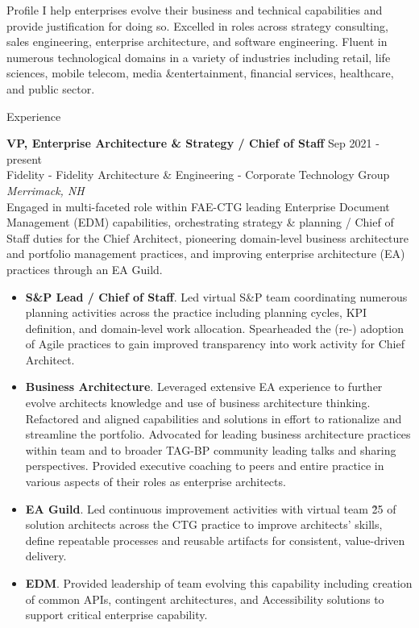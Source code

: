 \documentclass{resume} %
\begin{document}
\begin{rSection}{Profile}
I help enterprises evolve their business and technical capabilities and provide justification for doing so. Excelled in roles across strategy consulting, sales engineering, enterprise architecture, and software engineering. Fluent in numerous technological domains in a variety of industries including retail, life sciences, mobile telecom, media \&entertainment, financial services, healthcare, and public sector.

\end{rSection}

\begin{rSection}{Experience}

\textbf{VP, Enterprise Architecture \& Strategy / Chief of Staff} \hfill Sep 2021 - present\\
Fidelity - Fidelity Architecture \& Engineering - Corporate Technology Group \hfill \textit{Merrimack, NH}\\
Engaged in multi-faceted role within FAE-CTG leading Enterprise Document Management (EDM) capabilities, orchestrating strategy \& planning / Chief of Staff duties for the Chief Architect, pioneering domain-level business architecture and portfolio management practices, and improving enterprise architecture (EA) practices through an EA Guild.

\begin{itemize}
   \itemsep -3pt {} 
   \item \textbf{S\&P Lead / Chief of Staff}. Led virtual S\&P team coordinating numerous planning activities across the practice including planning cycles, KPI definition, and domain-level work allocation. Spearheaded the (re-) adoption of Agile practices to gain improved transparency into work activity for Chief Architect.
   \item \textbf{Business Architecture}. Leveraged extensive EA experience to further evolve architects knowledge and use of business architecture thinking. Refactored and aligned capabilities and solutions in effort to rationalize and streamline the portfolio. Advocated for leading business architecture practices within team and to broader TAG-BP community leading talks and sharing perspectives. Provided executive coaching to peers and entire practice in various aspects of their roles as enterprise architects.
   \item \textbf{EA Guild}. Led continuous improvement activities with virtual team \~25 of solution architects across the CTG practice to improve architects' skills, define repeatable processes and reusable artifacts for consistent, value-driven delivery.
   \item \textbf{EDM}. Provided leadership of team evolving this capability including creation of common APIs, contingent architectures, and Accessibility solutions to support critical enterprise capability. 
 \end{itemize}


\end{rSection}
\end{document}
